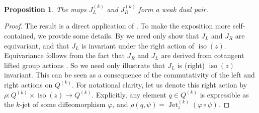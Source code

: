 \documentclass[12pt]{amsart}
\newtheorem{prop}[thm]{Proposition}
\DeclareMathOperator{\Jet}{Jet}
\DeclareMathOperator{\iso}{iso}
\begin{document}
  \begin{prop} \label{prop:k dual pairs}
  	The maps $J_L^{(k)}$ and $J_R^{(k)}$ form a weak dual pair.
  \end{prop}
  \begin{proof}
  	 The result is a direct application of \cite[Corollary 2.8]{GayBalmazVizman2012}. To make the exposition more self-contained, we provide some details. By \cite[Corollary 2.6]{GayBalmazVizman2012} we need only show that $J_L$ and $J_R$ are equivariant, and that $J_L$ is invariant under the right action of $\iso(z)$.
	Equivariance follows from the fact that $J_R$ and $J_L$ are derived from cotangent lifted group actions \cite[Corollary 4.2.11]{FOM}.
	So we need only illustrate that $J_L$ is (right) $\iso(z)$ invariant. This can be seen as a consequence of the commutativity of the left and right actions on $Q^{(k)}$.  
	For notational clarity, let us denote this right action by $\rho : Q^{(k)} \times \iso(z) \to Q^{(k)}$. 
	Explicitly, any element $q \in Q^{(k)}$ is expressible as the $k$-jet of some diffeomorphism $\varphi$,
	and $\rho( q , \psi) = \Jet_z^{(k)}( \varphi \circ \psi)$.
	

\end{proof}
\end{document}
